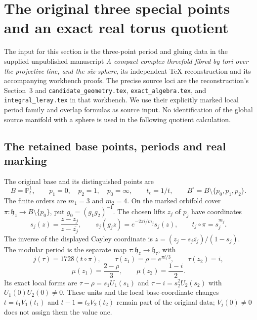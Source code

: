 \section{The original three special points and an exact real torus quotient}
\label{sec:s6q-three-points}

The input for this section is the three-point period and gluing data in
the supplied unpublished manuscript \emph{A compact complex threefold
fibred by tori over the projective line, and the six-sphere}, its independent
TeX reconstruction and its accompanying workbench proofs. The precise
source loci are the reconstruction's Section~3 and
\texttt{candidate\_geometry.tex},
\texttt{exact\_algebra.tex}, and \texttt{integral\_leray.tex} in that
workbench. We use their explicitly marked local period family and overlap
formulas as source input. No identification of the global source manifold
with a sphere is used in the following quotient calculation.

\subsection{The retained base points, periods and real marking}

The original base and its distinguished points are
\[
 B=\mathbb P^1_t,\qquad
 p_1=0,\quad p_2=1,\quad p_0=\infty,\qquad
 t_c=1/t,\qquad B^\circ=B\setminus\{p_0,p_1,p_2\}.
\]
The finite orders are $m_1=3$ and $m_2=4$. On the marked orbifold cover
$\pi:\mathfrak h_z\to B\setminus\{p_0\}$, put
$g_0=(g_1g_2)^{-1}$. The chosen lifts $z_j$ of $p_j$ have coordinates
\[
 s_j(z)=\frac{z-z_j}{z-\overline{z_j}},\qquad
 s_j(g_jz)=e^{-2\pi i/m_j}s_j(z),\qquad
 t_j\circ\pi=s_j^{m_j}.
\]
The inverse of the displayed Cayley coordinate is
$z=(z_j-s_j\overline{z_j})/(1-s_j)$. The modular period is the separate map
$\tau:\mathfrak h_z\to\mathfrak h_\tau$, with
\[
 j(\tau)=1728(t\circ\pi),\qquad
 \tau(z_1)=\rho=e^{\pi i/3},\qquad \tau(z_2)=i,
\]
\[
 \mu(z_1)=\frac{2-\rho}{3},\qquad \mu(z_2)=\frac{1-i}{2}.
\]
Its exact local forms are
$\tau-\rho=s_1U_1(s_1)$ and $\tau-i=s_2^2U_2(s_2)$ with
$U_1(0)U_2(0)\ne0$. These units and the local base-coordinate changes
$t=t_1V_1(t_1)$ and $t-1=t_2V_2(t_2)$ remain part of the original data;
$V_j(0)\ne0$ does not assign them the value one.

